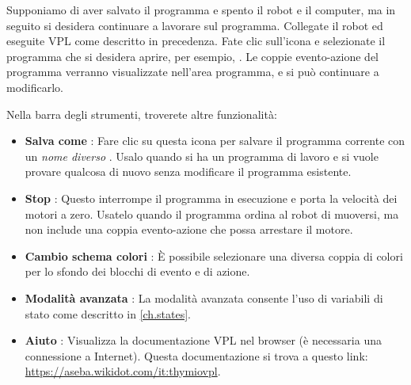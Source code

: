 
Supponiamo di aver salvato il programma e spento il robot e
il computer, ma in seguito si desidera continuare a lavorare sul programma.
Collegate il robot ed eseguite VPL come descritto in precedenza. Fate clic sull'icona
 e selezionate il programma che si desidera aprire, per esempio,
. Le coppie evento-azione del programma verranno visualizzate
nell'area programma, e si può continuare a modificarlo.


Nella barra degli strumenti, troverete altre funzionalità:

\begin{itemize}

\item \textbf{Salva come} :
Fare clic su questa icona per salvare il programma corrente con un \emph{nome diverso} .
Usalo quando si ha un programma di lavoro e si vuole provare qualcosa di nuovo senza modificare il programma esistente.

\item \textbf{Stop} : Questo interrompe il programma in esecuzione
e porta la velocità dei motori a zero. Usatelo quando il programma ordina
al robot di muoversi, ma non include una coppia evento-azione che possa
arrestare il motore.

\item \textbf{Cambio schema colori} : È possibile selezionare una
diversa coppia di colori per lo sfondo dei blocchi di evento e di azione.

\item \textbf{Modalità avanzata} : La modalità avanzata consente
l'uso di variabili di stato come descritto in \cref{ch.states}.

\item \textbf{Aiuto} : Visualizza la documentazione VPL nel
browser (è necessaria una connessione a Internet).
Questa documentazione si trova a questo link:
\url{https://aseba.wikidot.com/it:thymiovpl}.

\end{itemize}


